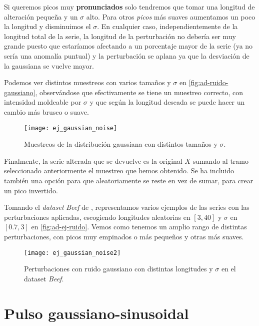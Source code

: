 Si queremos picos muy \textbf{pronunciados} solo tendremos que tomar una longitud de alteración pequeña y un $\sigma$ alto. Para otros \emph{picos} más suaves aumentamos un poco la longitud y disminuimos el $\sigma$. En cualquier caso, independientemente de la longitud total de la serie, la longitud de la perturbación no debería ser muy grande puesto que estaríamos afectando a un porcentaje mayor de la serie (ya no sería una anomalía puntual) y la perturbación se aplana ya que la desviación de la gaussiana se vuelve mayor.

Podemos ver distintos muestreos con varios tamaños y $\sigma$ en \autoref{fig:ad-ruido-gaussiano}, observándose que efectivamente se tiene un muestreo correcto, con intensidad moldeable por $\sigma$ y que según la longitud deseada se puede hacer un cambio más brusco o suave.

\begin{figure}[htpb]
  \centering
  \texttt{[image: ej\_gaussian\_noise]}
  \caption{Muestreos de la distribución gaussiana con distintos tamaños y $\sigma$.}
  \label{fig:ad-ruido-gaussiano}
\end{figure}

Finalmente, la serie alterada que se devuelve es la original $X$ sumando al tramo seleccionado anteriormente el muestreo que hemos obtenido. Se ha incluido también una opción para que aleatoriamente se reste en vez de sumar, para crear un pico invertido.

Tomando el \emph{dataset} \emph{Beef} de \cite{bagnall2020ts}, representamos varios ejemplos de las series con las perturbaciones aplicadas, escogiendo longitudes aleatorias en $[3, 40]$ y $\sigma$ en $[0.7, 3]$ en \autoref{fig:ad-ej-ruido}. Vemos como tenemos un amplio rango de distintas perturbaciones, con picos muy empinados o más pequeños y otras más suaves.

\begin{figure}[htpb]
  \centering
  \texttt{[image: ej\_gaussian\_noise2]}
  \caption{Perturbaciones con ruido gaussiano con distintas longitudes y $\sigma$ en el dataset \emph{Beef}.}
  \label{fig:ad-ej-ruido}
\end{figure}

\section{Pulso gaussiano-sinusoidal}

